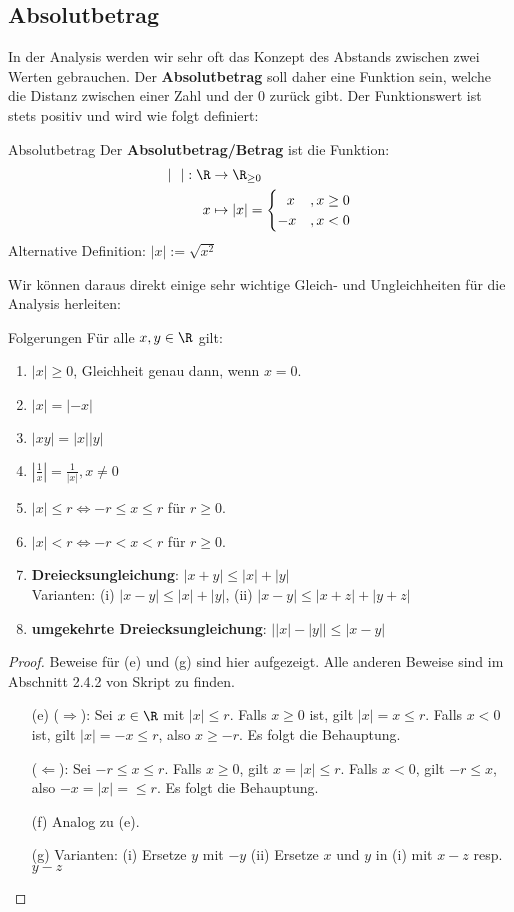 \subsection{Absolutbetrag}
In der Analysis werden wir sehr oft das Konzept des Abstands zwischen zwei Werten gebrauchen. Der \textbf{Absolutbetrag} soll daher eine Funktion sein, welche die Distanz zwischen einer Zahl und der 0 zurück gibt. Der Funktionswert ist stets positiv und wird wie folgt definiert:
\begin{definition}{Absolutbetrag}{}
Der \textbf{Absolutbetrag/Betrag} ist die Funktion:
\begin{align*}
    |\ \ |: \R &\to \R_{\geq 0}\\
    x &\mapsto |x| = \begin{cases} \ \ x &, x\geq 0\\-x &, x<0\end{cases}
\end{align*}
Alternative Definition: $|x| := \sqrt{x^2}$
\end{definition}
Wir können daraus direkt einige sehr wichtige Gleich- und Ungleichheiten für die Analysis herleiten:
\begin{satz}{Folgerungen}{} Für alle $x,y \in \R$ gilt:
\begin{enumerate}[label=(\alph*)]
    \item $|x| \geq 0$, Gleichheit genau dann, wenn $x=0$.
    \item $|x| = |-x|$
    \item $|xy| = |x||y|$
    \item $|\frac{1}{x}| = \frac{1}{|x|}, x \neq 0$
    \item $|x| \leq r \iff -r\leq x \leq r$ für $r \geq 0$.
    \item $|x| < r \iff -r < x < r$ für $r \geq 0$.
    \item \textbf{Dreiecksungleichung}: $|x+y| \leq |x|+|y|$ \\ Varianten: (i) $|x-y| \leq |x|+|y|$, (ii) $|x-y| \leq |x+z|+|y+z|$
    \item \textbf{umgekehrte Dreiecksungleichung}: $\big||x|-|y|\big| \leq |x-y|$
\end{enumerate}
\end{satz}
\begin{proof} Beweise für (e) und (g) sind hier aufgezeigt. Alle anderen Beweise sind im Abschnitt 2.4.2 von Skript zu finden.
\begin{itemize}
    \item[(e)]($\Longrightarrow$): Sei $x \in \R$ mit $|x| \leq r$. Falls $x\geq0$ ist, gilt $|x| = x \leq r$. Falls $x <0$ ist, gilt  $|x| = -x \leq r$, also $x \geq -r$. Es folgt die Behauptung. 
    
    ($\Longleftarrow$): Sei $-r\leq x \leq r$. Falls $x \geq 0$, gilt $x = |x| \leq r$. Falls $x < 0$, gilt $-r \leq x$, also $-x = |x| = \leq r$. Es folgt die Behauptung.
    \item[(f)] Analog zu (e).
    \item[(g)] Varianten: (i) Ersetze $y$ mit $-y$ (ii) Ersetze $x$ und $y$ in (i) mit $x-z$ resp. $y-z$
\end{itemize}
\end{proof}

